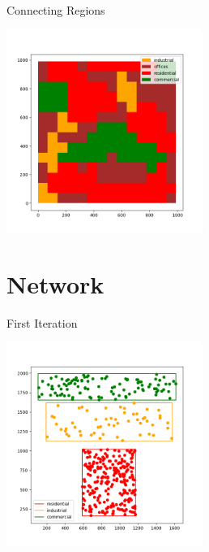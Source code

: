 \documentclass[10pt, aspectratio=169]{beamer}
\begin{document}
    \begin{frame}{Connecting Regions}
        \begin{center}
            \includegraphics[height=6.6cm, keepaspectratio]{images/finalzoning.png}
        \end{center}
    \end{frame}
    
    \section{Network}
    
    \begin{frame}{First Iteration}
        \begin{center}
            \includegraphics[height=6.6cm, keepaspectratio]{images/firstzoningwnodes.png}
        \end{center}
    \end{frame}
    
\end{document}
